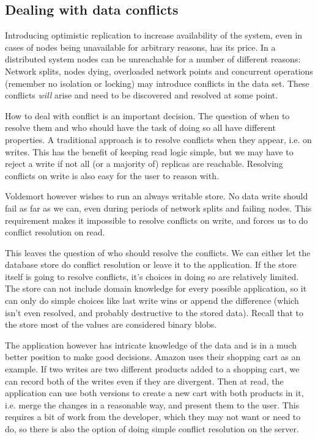 \subsection{Dealing with data conflicts}
Introducing optimistic replication to increase availability of the system, even in cases of nodes being unavailable for arbitrary reasons, has its price. 
In a distributed system nodes can be unreachable for a number of different reasons:
Network splits, nodes dying, overloaded network points and concurrent operations (remember no isolation or locking) may introduce conflicts in the data set.
These conflicts \emph{will} arise and need to be discovered and resolved at some point.

How to deal with conflict is an important decision.
The question of when to resolve them and who should have the task of doing so all have different properties.
A traditional approach is to resolve conflicts when they appear, i.e. on writes. 
This has the benefit of keeping read logic simple, but we may have to reject a write if not all (or a majority of) replicas are reachable. Resolving conflicts on write is also easy for the user to reason with.

Voldemort however wishes to run an always writable store. No data write should fail as far as we can, even during periods of network splits and failing nodes.
This requirement makes it impossible to resolve conflicts on write, and forces us to do conflict resolution on read.

This leaves the question of who should resolve the conflicts. We can either let the database store do conflict resolution or leave it to the application.
If the store itself is going to resolve conflicts, it's choices in doing so are relatively limited.
The store can not include domain knowledge for every possible application, so it can only do simple choices like last write wins or append the difference (which isn't even resolved, and probably destructive to the stored data). Recall that to the store most of the values are considered binary blobs.

The application however has intricate knowledge of the data and is in a much better position to make good decisions. 
Amazon\cite{dynamo} uses their shopping cart as an example. If two writes are two different products added to a shopping cart, we can record both of the writes even if they are divergent.
Then at read, the application can use both versions to create a new cart with both products in it, i.e. merge the changes in a reasonable way, and present them to the user.
This requires a bit of work from the developer, which they may not want or need to do, so there is also the option of doing simple conflict resolution on the server.

